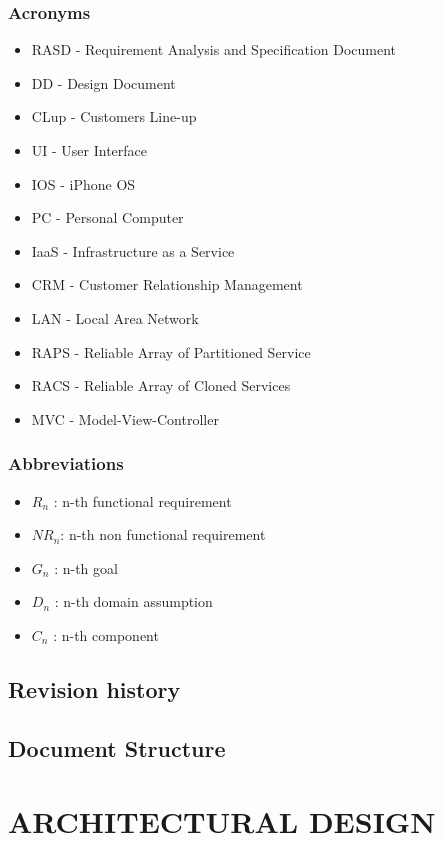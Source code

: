 \documentclass[a4paper,12pt]{report}
\begin{document}
\subsection{Acronyms}
\begin{itemize}
	\item RASD - Requirement Analysis and Specification Document
	\item DD - Design Document
	\item CLup - Customers Line-up
	\item UI - User Interface
	\item IOS - iPhone OS
	\item PC - Personal Computer
	\item IaaS - Infrastructure as a Service %
	\item CRM - Customer Relationship Management
	\item LAN - Local Area Network
	\item RAPS - Reliable Array of Partitioned Service
	\item RACS - Reliable Array of Cloned Services
	\item MVC - Model-View-Controller
\end{itemize}


\subsection{Abbreviations}
\begin{itemize}
	\item  $R_n$ : n-th functional requirement
	\item  $NR_n$: n-th non functional requirement
	\item  $G_n$ : n-th goal
	\item  $D_n$ : n-th domain assumption
	\item  $C_n$ : n-th component
\end{itemize}


\section{Revision history}


\section{Document Structure}


\chapter{ARCHITECTURAL DESIGN}\label{ch:architectural-design}
\end{document}
